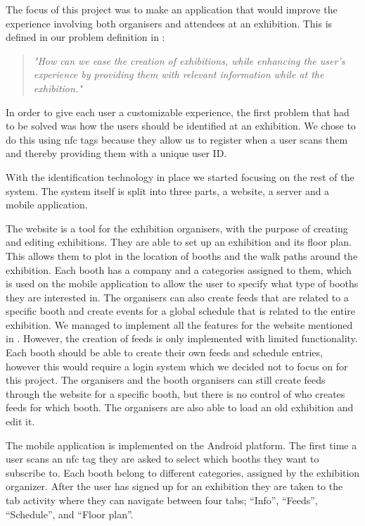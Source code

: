 The focus of this project was to make an application that would improve the experience involving both organisers and attendees at an exhibition.
This is defined in our problem definition in :
\begin{quote}
\textit{"How can we ease the creation of exhibitions, while enhancing the user's experience by providing them with relevant information while at the exhibition."}
\end{quote}
In order to give each user a customizable experience, the first problem that had to be solved was how the users should be identified at an exhibition. We chose to do this using \ac{nfc} tags because they allow us to register when a user scans them and thereby providing them with a unique user ID.
 
With the identification technology in place we started focusing on the rest of the system. The system itself is split into three parts, a website, a server and a mobile application.

The website is a tool for the exhibition organisers, with the purpose of creating and editing exhibitions. They are able to set up an exhibition and its floor plan. This allows them to plot in the location of booths and the walk paths around the exhibition. Each booth has a company and a categories assigned to them, which is used on the mobile application to allow the user to specify what type of booths they are interested in. The organisers can also create feeds that are related to a specific booth and create events for a global schedule that is related to the entire exhibition. We managed to implement all the features for the website mentioned in . However, the creation of feeds is only implemented with limited functionality. Each booth should be able to create their own feeds and schedule entries, however this would require a login system which we decided not to focus on for this project. The organisers and the booth organisers can still create feeds through the website for a specific booth, but there is no control of who creates feeds for which booth. The organisers are also able to load an old exhibition and edit it.

The mobile application is implemented on the Android platform. The first time a user scans an \ac{nfc} tag they are asked to select which booths they want to subscribe to. Each booth belong to different categories, assigned by the exhibition organizer. After the user has signed up for an exhibition they are taken to the tab activity where they can navigate between four tabs; ``Info'', ``Feeds'', ``Schedule'', and ``Floor plan''.

